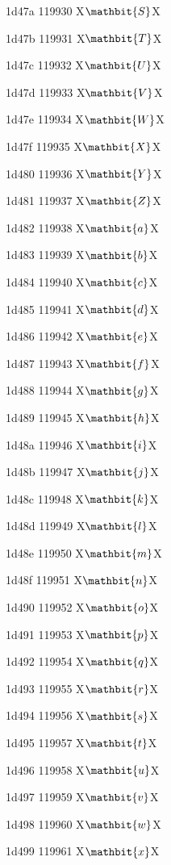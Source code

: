 \documentclass[11pt]{article}
\begin{document}
1d47a 119930 X{\ensuremath{\mathbit{S}}}X

1d47b 119931 X{\ensuremath{\mathbit{T}}}X

1d47c 119932 X{\ensuremath{\mathbit{U}}}X

1d47d 119933 X{\ensuremath{\mathbit{V}}}X

1d47e 119934 X{\ensuremath{\mathbit{W}}}X

1d47f 119935 X{\ensuremath{\mathbit{X}}}X

1d480 119936 X{\ensuremath{\mathbit{Y}}}X

1d481 119937 X{\ensuremath{\mathbit{Z}}}X

1d482 119938 X{\ensuremath{\mathbit{a}}}X

1d483 119939 X{\ensuremath{\mathbit{b}}}X

1d484 119940 X{\ensuremath{\mathbit{c}}}X

1d485 119941 X{\ensuremath{\mathbit{d}}}X

1d486 119942 X{\ensuremath{\mathbit{e}}}X

1d487 119943 X{\ensuremath{\mathbit{f}}}X

1d488 119944 X{\ensuremath{\mathbit{g}}}X

1d489 119945 X{\ensuremath{\mathbit{h}}}X

1d48a 119946 X{\ensuremath{\mathbit{i}}}X

1d48b 119947 X{\ensuremath{\mathbit{j}}}X

1d48c 119948 X{\ensuremath{\mathbit{k}}}X

1d48d 119949 X{\ensuremath{\mathbit{l}}}X

1d48e 119950 X{\ensuremath{\mathbit{m}}}X

1d48f 119951 X{\ensuremath{\mathbit{n}}}X

1d490 119952 X{\ensuremath{\mathbit{o}}}X

1d491 119953 X{\ensuremath{\mathbit{p}}}X

1d492 119954 X{\ensuremath{\mathbit{q}}}X

1d493 119955 X{\ensuremath{\mathbit{r}}}X

1d494 119956 X{\ensuremath{\mathbit{s}}}X

1d495 119957 X{\ensuremath{\mathbit{t}}}X

1d496 119958 X{\ensuremath{\mathbit{u}}}X

1d497 119959 X{\ensuremath{\mathbit{v}}}X

1d498 119960 X{\ensuremath{\mathbit{w}}}X

1d499 119961 X{\ensuremath{\mathbit{x}}}X
\end{document}
